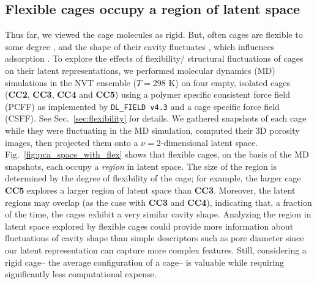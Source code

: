\documentclass[journal=jacsat,manuscript=article,layout=traditional]{achemso}
\begin{document}
\subsection{\color{red} Flexible cages occupy a region of latent space}
\label{sec:flexible_MD}
{\color{red}Thus far, we viewed the cage molecules as rigid. But, often cages are flexible to some degree \cite{chen2014separation,camp2016transition,holden2014gas,holden2016understanding}, and the shape of their cavity fluctuates \cite{chen2014separation}, which influences adsorption \cite{witman2017influence}.
To explore the effects of flexibility/ structural fluctuations of cages on their latent representations, we performed molecular dynamics (MD) simulations in the NVT ensemble ($T=$298 K) on four empty, isolated cages (\textbf{CC2}, \textbf{CC3}, \textbf{CC4} and \textbf{CC5}) using a polymer specific consistent force field (PCFF) \cite{sun1994ab,sun1994force,sun1995ab} as implemented by \texttt{DL\_FIELD v4.3} \cite{Yong2016dlfield} and a cage specific force field (CSFF)\cite{holden2012bespoke}. See Sec.~\ref{sec:flexibility} for details. We gathered snapshots of each cage while they were fluctuating in the MD simulation, computed their 3D porosity images, then projected them onto a $\nu=2$-dimensional latent space. Fig.~\ref{fig:pca_space_with_flex} shows that flexible cages, on the basis of the MD snapshots, each occupy a \emph{region} in latent space. The size of the region is determined by the degree of flexibility of the cage; for example, the larger cage \textbf{CC5} explores a larger region of latent space than \textbf{CC3}. Moreover, the latent regions may overlap (as the case with \textbf{CC3} and \textbf{CC4}), indicating that, a fraction of the time, the cages exhibit a very similar cavity shape. 
Analyzing the region in latent space explored by flexible cages could provide more information about fluctuations of cavity shape than simple descriptors such as pore diameter since our latent representation can capture more complex features. Still, considering a rigid cage-- the average configuration of a cage-- is valuable while requiring significantly less computational expense.
}
\end{document}
